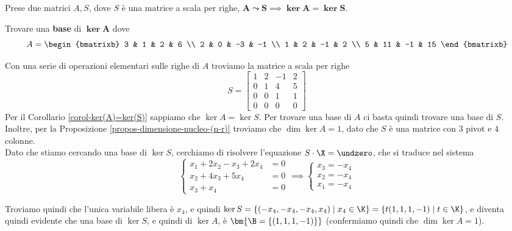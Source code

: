 \documentclass[11pt, a4paper, titlepage, oneside]{scrbook}
\begin{document}
\begin{Proposizione}[Corollario]
\label{corol-ker(A)=ker(S)}
Prese due matrici $A, S$, dove $S$ è una matrice a scala per righe, $\bm{A \leadsto S} \implies \bm{\ker A = \ker S}$.
\end{Proposizione}

\Esempio \nopagebreak

Trovare una \textbf{base} di $\bm{\ker A}$ dove \nopagebreak
\[
A = 
\begin{bmatrixb}
    3 & 1 & 2 & 6 \\
    2 & 0 & -3 & -1 \\
    1 & 2 & -1 & 2 \\
    5 & 11 & -1 & 15
\end{bmatrixb}
\]

Con una serie di operazioni elementari sulle righe di $A$ troviamo la matrice a scala per righe
\[ 
S = \begin{bmatrix}
    1 & 2 & -1 & 2 \\
    0 & 1 & 4 & 5 \\
    0 & 0 & 1 & 1 \\
    0 & 0 & 0 & 0
\end{bmatrix}
\] 
Per il Corollario \ref{corol-ker(A)=ker(S)} sappiamo che $\ker A = \ker S$. Per trovare una base di $A$ ci basta quindi trovare una base di $S$. Inoltre, per la Proposizione \ref{propos-dimensione-nucleo-(n-r)} troviamo che $\dim \ker A = 1$, dato che $S$ è una matrice con $3$ pivot e $4$ colonne. \\
Dato che stiamo cercando una base di $\ker S$, cerchiamo di risolvere l'equazione $S \cdot \X = \undzero$, che si traduce nel sistema
\[
\begin{cases}
x_1 + 2x_2 - x_3 + 2x_4 &= 0 \\
x_2 + 4x_3 +  5x_4 &= 0 \\
x_3 + x_4 &= 0 
\end{cases}
\implies
\begin{cases}
    x_3 = - x_4 \\
    x_2 = -x_4 \\
    x_1 = -x_4
\end{cases}
\]

Troviamo quindi che l'unica variabile libera è $x_4$, e quindi \mbox{$\ker S = \{(-x_4, -x_4, -x_4, x_4) \mid x_4 \in \K\} = \{t (1,1,1,-1)\mid t \in \K\}$}, e diventa quindi evidente che una base di $\ker S$, e quindi di $\ker A$, è $\bm{\B = \{(1,1,1,-1)\}}$ (confermiamo quindi che $\dim \ker A = 1$). 
\end{document}
